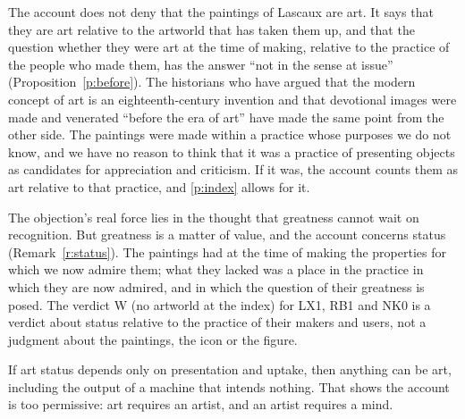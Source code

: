 \documentclass{situationist-preprint}
\begin{document}
\begin{reply}
The account does not deny that the paintings of Lascaux are art. It says that they are art relative to the artworld that has taken them up, and that the question whether they were art at the time of making, relative to the practice of the people who made them, has the answer \enquote{not in the sense at issue} (Proposition~\ref{p:before}). The historians who have argued that the modern concept of art is an eighteenth-century invention \citep{Kristeller1951,Shiner2001} and that devotional images were made and venerated \enquote{before the era of art} \citep{Belting1994} have made the same point from the other side. The paintings were made within a practice whose purposes we do not know, and we have no reason to think that it was a practice of presenting objects as candidates for appreciation and criticism. If it was, the account counts them as art relative to that practice, and \ref{p:index} allows for it.

The objection's real force lies in the thought that greatness cannot wait on recognition. But greatness is a matter of value, and the account concerns status (Remark~\ref{r:status}). The paintings had at the time of making the properties for which we now admire them; what they lacked was a place in the practice in which they are now admired, and in which the question of their greatness is posed. The verdict W (no artworld at the index) for LX1, RB1 and NK0 is a verdict about status relative to the practice of their makers and users, not a judgment about the paintings, the icon or the figure.
\end{reply}

\begin{objection}\label{o:machine}
If art status depends only on presentation and uptake, then anything can be art, including the output of a machine that intends nothing. That shows the account is too permissive: art requires an artist, and an artist requires a mind.
\end{objection}
\end{document}
